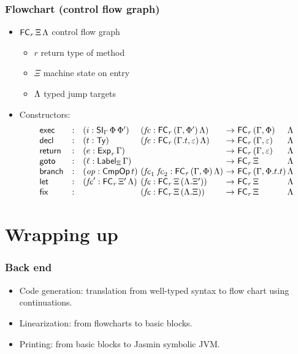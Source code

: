 \documentclass[t,fleqn,usenames,dvipsnames]{beamer}
\newcommand{\Exp}[2][]{\mathsf{Exp}_{#1}\,#2}
\newcommand{\vrt}{\mathit{r}}
\newcommand{\vop}{\mathit{op}}
\newcommand{\tCmpOp}{\mathsf{CmpOp}}
\newcommand{\CmpOp}[1]{\tCmpOp\,#1}
\newcommand{\tdecl}{\mathsf{decl}}
\newcommand{\treturn}{\mathsf{return}}
\newcommand{\tSI}{\mathsf{SI}}
\newcommand{\SI}[3][]{\tSI_{#1}\,#2\,#3}
\newcommand{\tLabel}{\mathsf{Label}}
\newcommand{\Label}[2][]{\tLabel_{#1}\,{#2}}
\newcommand{\tFC}{\mathsf{FC}}
\newcommand{\FC}[3][]{\tFC_{#1}\,#2\,#3}
\newcommand{\tlet}{\mathsf{let}}
\newcommand{\tfix}{\mathsf{fix}}
\newcommand{\texec}{\mathsf{exec}}
\newcommand{\vfc}{\mathit{fc}}
\newcommand{\tbranch}{\mathsf{branch}}
\newcommand{\tgoto}{\mathsf{goto}}
\begin{document}
\begin{frame}%
  \frametitle{Flowchart (control flow graph)}
  \vspace{-3ex}
  \begin{itemize}
  \item $\FC[\vrt] \Xi \GL$ control flow graph
    \begin{itemize}
    \item $\vrt$ return type of method
    \item $\Xi$ machine state on entry
    \item $\Lambda$ typed jump targets
    \end{itemize}
  \item Constructors:
\[
\begin{array}{lcl@{}l@{~}c@{~}l@{}l}
  \texec   & : & (i : \SI[\Gamma] \Phi {\Phi'})\ & (\vfc : \FC[\vrt] {(\Gamma,\Phi')} \GL)
                 & \to & \FC[\vrt] {(\Gamma,\Phi)} {&\GL} \\
  \tdecl   & : & (t : \Ty)\ & (\vfc : \FC[\vrt] {(\Gamma.t,\Ge)} \GL) & \to & \FC[\vrt] {(\Gamma,\Ge)} {&\GL} \\
  \treturn & : & (e : \Exp[\vrt] \Gamma) & & \to & \FC[\vrt] {(\Gamma,\Ge)} {&\GL} \\
  \tgoto   & : & (\ell : \Label[\Xi]\Gamma) & & \to & \FC[\vrt] \Xi {&\GL} \\
  \tbranch & : & (\vop : \CmpOp t) \ & (\vfc_1\;\vfc_2 : \FC[\vrt] {(\Gamma,\Phi)} \GL) & \to & \FC[\vrt] {(\Gamma,\Phi.t.t)} {&\GL} \\
  \tlet    & : & (\vfc' : \FC[\vrt] {\Xi'} \GL)\ & (\vfc : \FC[\vrt] \Xi {(\GL.\Xi')}) & \to & \FC[\vrt] \Xi {&\GL} \\
  \tfix    & : & & (\vfc : \FC[\vrt] \Xi {(\GL.\Xi)}) & \to & \FC[\vrt] \Xi {&\GL} \\
\end{array}
\]
  \end{itemize}
\end{frame}


\section{Wrapping up}


\begin{frame}%
  \frametitle{Back end}
  \vspace{-3ex}
  \begin{itemize}
  \item Code generation: translation from well-typed syntax to flow chart using continuations.
  \item Linearization: from flowcharts to basic blocks.
  \item Printing: from basic blocks to Jasmin symbolic JVM.
  \end{itemize}
\end{frame}
\end{document}
